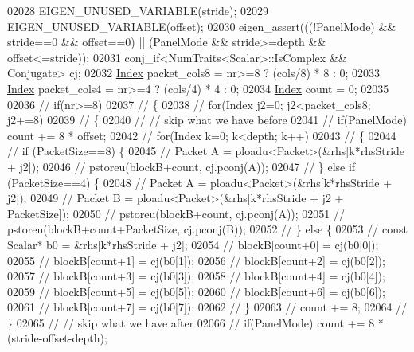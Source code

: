 \begin{DoxyCode}
02028   EIGEN\_UNUSED\_VARIABLE(stride);
02029   EIGEN\_UNUSED\_VARIABLE(offset);
02030   eigen\_assert(((!PanelMode) && stride==0 && offset==0) || (PanelMode && stride>=depth && offset<=stride));
02031   conj\_if<NumTraits<Scalar>::IsComplex && Conjugate> cj;
02032   \hyperlink{namespace_eigen_a62e77e0933482dafde8fe197d9a2cfde}{Index} packet\_cols8 = nr>=8 ? (cols/8) * 8 : 0;
02033   \hyperlink{namespace_eigen_a62e77e0933482dafde8fe197d9a2cfde}{Index} packet\_cols4 = nr>=4 ? (cols/4) * 4 : 0;
02034   \hyperlink{namespace_eigen_a62e77e0933482dafde8fe197d9a2cfde}{Index} count = 0;
02035 
02036 \textcolor{comment}{//   if(nr>=8)}
02037 \textcolor{comment}{//   \{}
02038 \textcolor{comment}{//     for(Index j2=0; j2<packet\_cols8; j2+=8)}
02039 \textcolor{comment}{//     \{}
02040 \textcolor{comment}{//       // skip what we have before}
02041 \textcolor{comment}{//       if(PanelMode) count += 8 * offset;}
02042 \textcolor{comment}{//       for(Index k=0; k<depth; k++)}
02043 \textcolor{comment}{//       \{}
02044 \textcolor{comment}{//         if (PacketSize==8) \{}
02045 \textcolor{comment}{//           Packet A = ploadu<Packet>(&rhs[k*rhsStride + j2]);}
02046 \textcolor{comment}{//           pstoreu(blockB+count, cj.pconj(A));}
02047 \textcolor{comment}{//         \} else if (PacketSize==4) \{}
02048 \textcolor{comment}{//           Packet A = ploadu<Packet>(&rhs[k*rhsStride + j2]);}
02049 \textcolor{comment}{//           Packet B = ploadu<Packet>(&rhs[k*rhsStride + j2 + PacketSize]);}
02050 \textcolor{comment}{//           pstoreu(blockB+count, cj.pconj(A));}
02051 \textcolor{comment}{//           pstoreu(blockB+count+PacketSize, cj.pconj(B));}
02052 \textcolor{comment}{//         \} else \{}
02053 \textcolor{comment}{//           const Scalar* b0 = &rhs[k*rhsStride + j2];}
02054 \textcolor{comment}{//           blockB[count+0] = cj(b0[0]);}
02055 \textcolor{comment}{//           blockB[count+1] = cj(b0[1]);}
02056 \textcolor{comment}{//           blockB[count+2] = cj(b0[2]);}
02057 \textcolor{comment}{//           blockB[count+3] = cj(b0[3]);}
02058 \textcolor{comment}{//           blockB[count+4] = cj(b0[4]);}
02059 \textcolor{comment}{//           blockB[count+5] = cj(b0[5]);}
02060 \textcolor{comment}{//           blockB[count+6] = cj(b0[6]);}
02061 \textcolor{comment}{//           blockB[count+7] = cj(b0[7]);}
02062 \textcolor{comment}{//         \}}
02063 \textcolor{comment}{//         count += 8;}
02064 \textcolor{comment}{//       \}}
02065 \textcolor{comment}{//       // skip what we have after}
02066 \textcolor{comment}{//       if(PanelMode) count += 8 * (stride-offset-depth);}

\end{DoxyCode}
